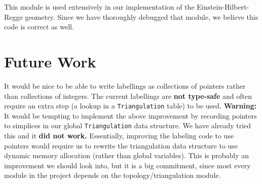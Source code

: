This module is used extensively in our implementation of the Einstein-Hilbert-Regge geometry. Since we have thoroughly debugged that module, we believe this code is correct as well.

\section{Future Work}

It would be nice to be able to write labellings as collections of pointers rather than collections of integers. The current labellings are \textbf{not type-safe} and often require an extra step (a lookup in a \texttt{Triangulation} table) to be used.\newline
\textbf{Warning:} It would be tempting to implement the above improvement by recording pointers to simplices in our global \texttt{Triangulation} data structure. We have already tried this and it \textbf{did not work.} Essentially, improving the labeling code to use pointers would require us to rewrite the triangulation data structure to use dynamic memory allocation (rather than global variables). This is probably an improvement we should look into, but it is a big commitment, since most every module in the project depends on the topology/triangulation module. 
    
